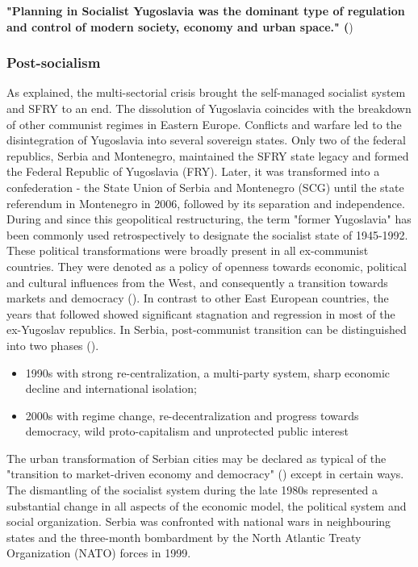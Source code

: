 \documentclass[11pt]{report}
\begin{document}
{{{{\textbf{"Planning  in  Socialist  Yugoslavia  was  the  dominant  type  of  regulation  and  control  of  modern  society, economy and urban space." (\href{Vukmirovic}{\citealt{vukmirovic_city_2013}}})

\subsubsection{Post-socialism}

As explained, the multi-sectorial crisis brought the self-managed socialist system and SFRY to an end. The dissolution of Yugoslavia coincides with the breakdown of other communist regimes in Eastern Europe. Conflicts and warfare led to the disintegration of Yugoslavia into several sovereign states. Only two of the federal republics, Serbia and Montenegro, maintained the SFRY state legacy and formed the Federal Republic of Yugoslavia (FRY). Later, it was transformed into a confederation - the State Union of Serbia and Montenegro (SCG) until the state referendum in Montenegro in 2006, followed by its separation and independence. During and since this geopolitical restructuring, the term "former Yugoslavia" has been commonly used retrospectively to designate the socialist state of 1945-1992.
\\

These political transformations were broadly present in all ex-communist countries. They were denoted as a policy of openness towards economic, political and cultural influences from the West, and consequently a transition towards markets and democracy (\href{Vujosevic}{\citealt{vujosevic_conundrum_2012}}). In contrast to other East European countries, the years that followed showed significant stagnation and regression in most of the ex-Yugoslav republics. In Serbia, post-communist transition can be distinguished into two phases (\href{Nedovic}{\citealt{nedovic-budic_mornings_2011}}).

\begin{itemize}
\item 1990s with strong re-centralization, a multi-party system, sharp economic decline and international isolation;
\item 2000s with regime change, re-decentralization and progress towards democracy, wild proto-capitalism and unprotected public interest
\end{itemize}       
     
The urban transformation of Serbian cities may be declared as typical of the "transition to market-driven economy and democracy" (\href{Tsenkova}{\citealt{tsenkova_beyond_2006}}) except in certain ways. The dismantling of the socialist system during the late 1980s represented a substantial change in all aspects of the economic model, the political system and social organization. Serbia was confronted with national wars in  neighbouring states and the three-month bombardment by the North Atlantic Treaty Organization (NATO) forces in 1999.
\\

}}}}
\end{document}
